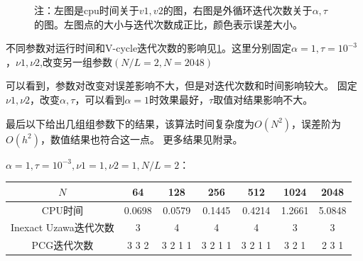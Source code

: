 \documentclass{article}
\begin{document}
\begin{figure}[!h]
  \centering
  \caption{注：左图是cpu时间关于$v1,v2$的图，右图是外循环迭代次数关于$\alpha,\tau$的图。左图点的大小与迭代次数成正比，颜色表示误差大小。}
  \label{fig:1}
\end{figure}

不同参数对运行时间和V-cycle迭代次数的影响见\ref{fig:1}。这里分别固定$\alpha = 1, \tau = 10^{-3}$，$\nu1, \nu2$,改变另一组参数$(N/L=2,N=2048)$

可以看到，参数对改变对误差影响不大，但是对迭代次数和时间影响较大。
固定$\nu1,\nu2$，改变$\alpha,\tau$，可以看到$\alpha = 1$时效果最好，$\tau$取值对结果影响不大。

\newpage
最后以下给出几组组参数下的结果，该算法时间复杂度为$O(N^2)$，误差阶为$O(h^2)$，数值结果也符合这一点。
更多结果见附录。

$\alpha = 1, \tau = 10^{-3}, \nu1 = 1, \nu2 = 1, N/L = 2$：

\begin{table}[!h]
  \centering
  \begin{tabular}{ccccccc}
    \toprule
    $N$ & 64 & 128 & 256 & 512 & 1024 & 2048 \\
    \midrule
    CPU时间 & 0.0698 & 0.0579 & 0.1445 & 0.4214 & 1.2661 & 5.0848 \\
    Inexact Uzawa迭代次数 & 3 & 4 & 4 & 4 & 3 & 3 \\
    PCG迭代次数 & 3 3 2 & 3 2 1 1 & 3 2 1 1 & 3 2 1 1 & 3 2 1 & 2 3 1 \\
    \bottomrule
  \end{tabular}
\end{table}
\end{document}
